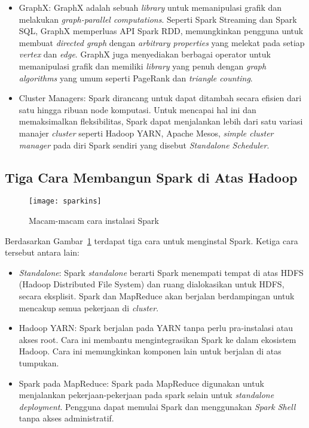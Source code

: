 \begin{itemize}
\item GraphX: GraphX adalah sebuah \textit{library} untuk memanipulasi grafik dan melakukan \textit{graph-parallel computations}. Seperti Spark Streaming dan Spark SQL, GraphX memperluas API Spark RDD, memungkinkan pengguna untuk membuat \textit{directed graph} dengan \textit{arbitrary properties} yang melekat pada setiap \textit{vertex} dan \textit{edge}. GraphX juga menyediakan berbagai operator untuk memanipulasi grafik dan memiliki \textit{library} yang penuh dengan \textit{graph algorithms} yang umum seperti PageRank dan \textit{triangle counting}.

\item Cluster Managers: Spark dirancang untuk dapat ditambah secara efisien dari satu hingga ribuan node komputasi. Untuk mencapai hal ini dan memaksimalkan fleksibilitas, Spark dapat menjalankan lebih dari satu variasi manajer \textit{cluster} seperti Hadoop YARN, Apache Mesos, \textit{simple
cluster manager} pada diri Spark sendiri yang disebut \textit{Standalone Scheduler}.\\

\end{itemize}

\subsection{Tiga Cara Membangun Spark di Atas Hadoop}

\begin{figure}[H]
    \centering  
    \texttt{[image: sparkins]}  
    \caption[Macam-macam cara instalasi Spark]{Macam-macam cara instalasi Spark} 
    \label{fig:sparkins} 
\end{figure}

Berdasarkan Gambar~\ref{fig:sparkins} terdapat tiga cara untuk menginstal Spark. Ketiga cara tersebut antara lain:

\begin{itemize}

\item \textit{Standalone}: Spark \textit{standalone} berarti Spark menempati tempat di atas HDFS (Hadoop Distributed File System) dan ruang dialokasikan untuk HDFS, secara eksplisit. Spark dan MapReduce akan berjalan berdampingan untuk mencakup semua pekerjaan di \textit{cluster}.

\item Hadoop YARN: Spark berjalan pada YARN tanpa perlu pra-instalasi atau akses root. Cara ini membantu mengintegrasikan Spark ke dalam ekosistem Hadoop. Cara ini memungkinkan komponen lain untuk berjalan di atas tumpukan.

\item Spark pada MapReduce: Spark pada MapReduce digunakan untuk menjalankan pekerjaan-pekerjaan pada spark selain untuk \textit{standalone deployment}. Pengguna dapat memulai Spark dan menggunakan \textit{Spark Shell} tanpa akses administratif.\\

\end{itemize}









